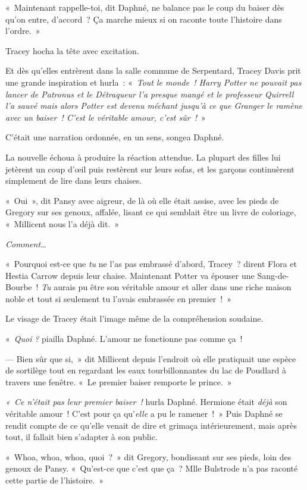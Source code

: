 «~Maintenant rappelle-toi, dit Daphné, ne balance pas le coup du baiser dès qu'on entre, d'accord~?
Ça marche mieux si on raconte toute l'histoire dans l'ordre.~»

Tracey hocha la tête avec excitation.

Et dès qu'elles entrèrent dans la salle commune de Serpentard, Tracey Davis prit une grande inspiration et hurla~: «~\emph{Tout le monde~!
Harry Potter ne pouvait pas lancer de Patronus et le Détraqueur l'a presque mangé et le professeur Quirrell l'a sauvé mais alors Potter est devenu méchant jusqu'à ce que Granger le ramène avec un baiser~!
C'est le véritable amour, c'est sûr~!}~»

C'était une narration ordonnée, en un sens, songea Daphné.

La nouvelle échoua à produire la réaction attendue.
La plupart des filles lui jetèrent un coup d'œil puis restèrent sur leurs sofas, et les garçons continuèrent simplement de lire dans leurs chaises.

«~Oui~», dit Pansy avec aigreur, de là où elle était assise, avec les pieds de Gregory sur ses genoux, affalée, lisant ce qui semblait être un livre de coloriage, «~Millicent nous l'a déjà dit.~»

\emph{Comment…}

«~Pourquoi est-ce que \emph{tu} ne l'as pas embrassé d'abord, Tracey~? dirent Flora et Hestia Carrow depuis leur chaise.
Maintenant Potter va épouser une Sang-de-Bourbe~!
\emph{Tu} aurais pu être son véritable amour et aller dans une riche maison noble et tout si seulement tu l'avais embrassée en premier~!~»

Le visage de Tracey était l'image même de la compréhension soudaine.

«~\emph{Quoi} \emph{?} piailla Daphné.
L'amour ne fonctionne pas comme ça~!

--- Bien sûr que si,~» dit Millicent depuis l'endroit où elle pratiquait une espèce de sortilège tout en regardant les eaux tourbillonnantes du lac de Poudlard à travers une fenêtre.
«~Le premier baiser remporte le prince.~»

\emph{«~Ce n'était pas leur premier baiser~!} hurla Daphné.
Hermione était \emph{déjà} son véritable amour~!
C'est pour ça qu'\emph{elle} a pu le ramener~!~»
Puis Daphné se rendit compte de ce qu'elle venait de dire et grimaça intérieurement, mais après tout, il fallait bien s'adapter à son public.

«~Whoa, whoa, whoa, quoi~?~»
dit Gregory, bondissant sur ses pieds, loin des genoux de Pansy.
«~Qu'est-ce que c'est que ça~?
Mlle Bulstrode n'a pas raconté cette partie de l'histoire.~»

